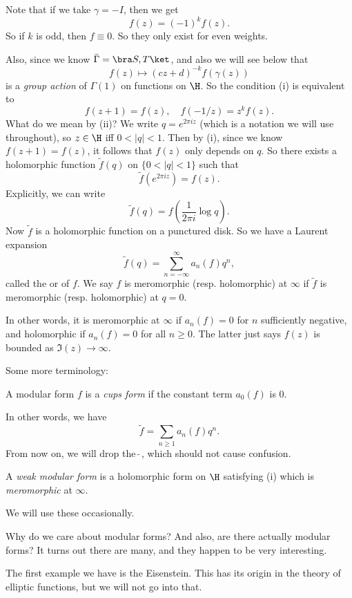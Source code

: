 \documentclass[a4paper]{article}
\begin{document}
Note that if we take $\gamma = -I$, then we get
\[
  f(z) = (-1)^k f(z).
\]
So if $k$ is odd, then $f \equiv 0$. So they only exist for even weights.

Also, since we know $\bar\Gamma = \bra S, T\ket$, and also we will see below that
\[
  f(z) \mapsto (cz + d)^{-k} f(\gamma(z))
\]
is a \emph{group action} of $\Gamma(1)$ on functions on $\H$. So the condition (i) is equivalent to
\[
  f(z + 1) = f(z),\quad f(-1/z) = z^k f(z).
\]
What do we mean by (ii)? We write $q = e^{2\pi i z}$ (which is a notation we will use throughout), so $z \in \H$ iff $0 < |q| < 1$. Then by (i), since we know $f(z + 1) = f(z)$, it follows that $f(z)$ only depends on $q$. So there exists a holomorphic function $\tilde{f}(q)$ on $\{0< |q| < 1\}$ such that
\[
  \tilde{f}(e^{2\pi i z}) = f(z).
\]
Explicitly, we can write
\[
  \tilde{f}(q) = f\left(\frac{1}{2\pi i} \log q\right).
\]
Now $\tilde{f}$ is a holomorphic function on a punctured disk. So we have a Laurent expansion
\[
  \tilde{f}(q) = \sum_{n = -\infty}^\infty a_n (f) q^n,
\]
called the  or  of $f$. We say $f$ is meromorphic (resp. holomorphic) at $\infty$ if $\tilde{f}$ is meromorphic (resp. holomorphic) at $q = 0$.

In other words, it is meromorphic at $\infty$ if $a_n(f) = 0$ for $n$ sufficiently negative, and holomorphic if $a_n(f) = 0$ for all $n \geq 0$. The latter just says $f(z)$ is bounded as $\Im(z) \to \infty$.

Some more terminology:
\begin{defi}
  A modular form $f$ is a \emph{cups form} if the constant term $a_0(f)$ is $0$.
\end{defi}

In other words, we have
\[
  \tilde{f} = \sum_{n\geq 1} a_n(f) q^n.
\]
From now on, we will drop the $\tilde{\;}$, which should not cause confusion.

\begin{defi}
  A \emph{weak modular form} is a holomorphic form on $\H$ satisfying (i) which is \emph{meromorphic} at $\infty$.
\end{defi}
We will use these occasionally.

Why do we care about modular forms? And also, are there actually modular forms? It turns out there are many, and they happen to be very interesting.

The first example we have is the Eisenstein. This has its origin in the theory of elliptic functions, but we will not go into that.
\end{document}
